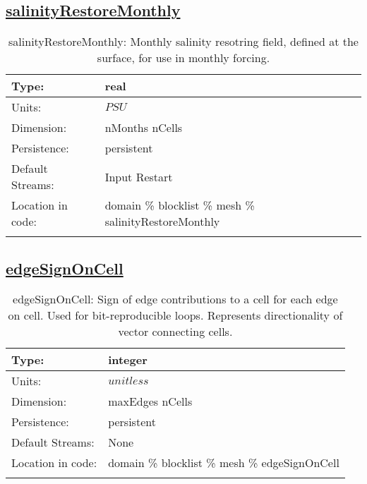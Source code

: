 \subsection[salinityRestoreMonthly]{\hyperref[sec:var_tab_mesh]{salinityRestoreMonthly}}
\label{subsec:var_sec_mesh_salinityRestoreMonthly}
\begin{center}
\begin{longtable}{| p{2.0in} | p{4.0in} |}
        \hline 
        Type: & real \\
        \hline 
        Units: & $PSU$ \\
        \hline 
        Dimension: & nMonths nCells \\
        \hline 
        Persistence: & persistent \\
        \hline 
		 Default Streams: & Input Restart  \\
        \hline 
		 Location in code: & domain \% blocklist \% mesh \% salinityRestoreMonthly \\
		 \hline 
    \caption{salinityRestoreMonthly: Monthly salinity resotring field, defined at the surface, for use in monthly forcing.}
\end{longtable}
\end{center}
\subsection[edgeSignOnCell]{\hyperref[sec:var_tab_mesh]{edgeSignOnCell}}
\label{subsec:var_sec_mesh_edgeSignOnCell}
\begin{center}
\begin{longtable}{| p{2.0in} | p{4.0in} |}
        \hline 
        Type: & integer \\
        \hline 
        Units: & $unitless$ \\
        \hline 
        Dimension: & maxEdges nCells \\
        \hline 
        Persistence: & persistent \\
        \hline 
		 Default Streams: & None \\
        \hline 
		 Location in code: & domain \% blocklist \% mesh \% edgeSignOnCell \\
		 \hline 
    \caption{edgeSignOnCell: Sign of edge contributions to a cell for each edge on cell. Used for bit-reproducible loops. Represents directionality of vector connecting cells.}
\end{longtable}
\end{center}
